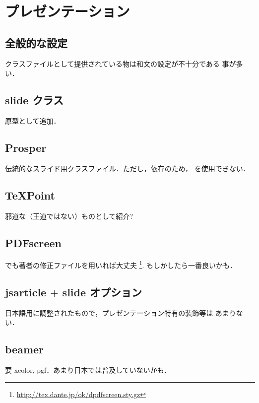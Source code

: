 ﻿\chapter{プレゼンテーション}

\begin{abstract}
 
\end{abstract}

\section{全般的な設定}

クラスファイルとして提供されている物は和文の設定が不十分である
事が多い．

\section{slide クラス}

\begin{append}
 原型として追加．
\end{append}

\section{Prosper}

\begin{append}
 伝統的なスライド用クラスファイル．ただし，\PS 依存のため，
\dvipdfmx を使用できない．
\end{append}

\section{\TeX Point}

\begin{append}
 邪道な（王道ではない）ものとして紹介?
\end{append}

\section{PDFscreen}

\begin{append}
 \dvipdfmx でも著者の修正ファイルを用いれば大丈夫
 \footnote{\url{http://tex.dante.jp/ok/dpdfscreen.sty.gz}}.
 もしかしたら一番良いかも．
\end{append}


\section{jsarticle $+$ slide オプション}

\begin{append}
 日本語用に調整されたもので，プレゼンテーション特有の装飾等は
 あまりない．
\end{append}


\section{beamer}

\begin{append}
 要 xcolor, pgf．あまり日本では普及していないかも．
\end{append}


